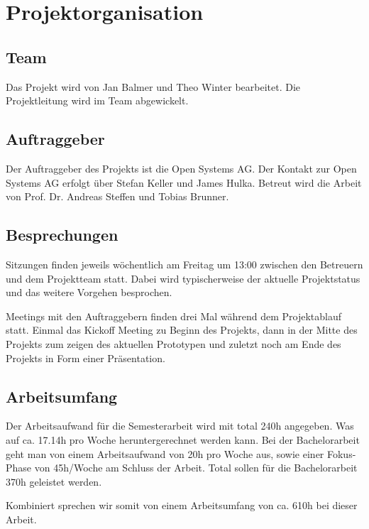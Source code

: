 \section{Projektorganisation}
\label{sec:Projektorganisation}

\subsection{Team}
Das Projekt wird von Jan Balmer und Theo Winter bearbeitet. Die Projektleitung wird im Team abgewickelt.

\subsection{Auftraggeber}
Der Auftraggeber des Projekts ist die Open Systems AG. Der Kontakt zur Open Systems AG erfolgt über Stefan Keller und James Hulka. Betreut wird die Arbeit von Prof. Dr. Andreas Steffen und Tobias Brunner.

\subsection{Besprechungen}
Sitzungen finden jeweils wöchentlich am Freitag um 13:00 zwischen den Betreuern und dem Projektteam statt. Dabei wird typischerweise der aktuelle Projektstatus und das weitere Vorgehen besprochen.

Meetings mit den Auftraggebern finden drei Mal während dem Projektablauf statt. Einmal das Kickoff Meeting zu Beginn des Projekts, dann in der Mitte des Projekts zum zeigen des aktuellen Prototypen und zuletzt noch am Ende des Projekts in Form einer Präsentation.

\subsection{Arbeitsumfang}
Der Arbeitsaufwand für die Semesterarbeit wird mit total 240h angegeben. Was auf ca. 17.14h pro Woche heruntergerechnet werden kann.
Bei der Bachelorarbeit geht man von einem Arbeitsaufwand von 20h pro Woche aus, sowie einer Fokus-Phase von 45h/Woche am Schluss der Arbeit. Total sollen für die Bachelorarbeit 370h geleistet werden.

Kombiniert sprechen wir somit von einem Arbeitsumfang von ca. 610h bei dieser Arbeit.